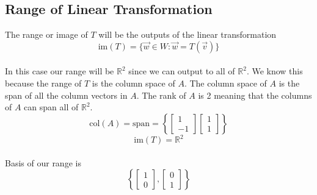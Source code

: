 \documentclass[12pt]{article}
\begin{document}
\subsection{Range of Linear Transformation}The range or image of $T$ will be the outputs of the linear transformation
\begin{equation*}\text{im}(T) = \{\vec{w} \in W : \vec{w} = T(\vec{v})\}\end{equation*}
\\ In this case our range will be $\mathbb{R}^2$ since we can output to all of  $\mathbb{R}^2$. We know this because the range of $T$ is the column space of $A$. The column space of $A$ is the span of all the column vectors in $A$. The rank of $A$ is 2 meaning that the columns of $A$ can span all of $\mathbb{R}^2$.
\begin{equation*}\text{col}(A) = \text{span} = \left\{\begin{bmatrix}1 \\ -1\end{bmatrix}\begin{bmatrix}1 \\ 1\end{bmatrix}\right\} \end{equation*}
\begin{equation*}\text{im}(T) = \mathbb{R}^2\end{equation*}
\\Basis of our range is \begin{equation*}\left\{\begin{bmatrix} 1  \\ 0\end{bmatrix},\begin{bmatrix} 0 \\ 1 \end{bmatrix} \right\}\end{equation*}
\end{document}
